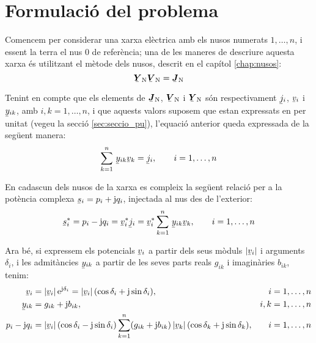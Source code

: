 \section{Formulació del problema}\label{sec:formul_prob} 

Comencem per considerar una xarxa elèctrica amb els nusos numerats
$1,\ldots,n$, i essent la terra el nus 0 de referència; una de les
maneres de descriure aquesta xarxa és utilitzant el mètode dels
nusos, descrit en el capítol \ref{chap:nusos}:
\begin{equation}
    \mcmplx{Y}\ped{N} \mcmplx{V}\ped{N} = \mcmplx{J}\ped{N}
\end{equation}

Tenint en compte que els elements de $\mcmplx{J}\ped{N}$,
$\mcmplx{V}\ped{N}$ i $\mcmplx{Y}\ped{N}$ són respectivament $\cmplx{j}_i$,
$\cmplx{v}_i$ i  $\cmplx{y}_{ik}$, amb $i,k=1,\ldots,n$, 
i que aquests valors suposem que estan expressats en per unitat (vegeu la
secció \ref{sec:seccio_pu}), l'equació anterior queda expressada de
la següent manera:
\begin{equation}
    \sum^n_{k=1}\, \cmplx{y}_{ik} \cmplx{v}_k = \cmplx{j}_i, \qquad i=1,\ldots,n
\end{equation}

En cadascun dels nusos de la xarxa es compleix la següent relació
per a la potència complexa $\cmplx{s}_i = p_i + \ju q_i$, injectada
al nus des de l'exterior:
\begin{equation}
    \cmplx{s}_i^* = p_i - \ju q_i = \cmplx{v}_i^* \cmplx{j}_i = \cmplx{v}_i^*
    \sum^n_{k=1}\, \cmplx{y}_{ik} \cmplx{v}_k, \qquad i=1,\ldots,n \label{eq:sconj}
\end{equation}

Ara bé, si expressem els potencials $\cmplx{v}_i$ a partir dels seus mòduls $|\cmplx{v}_i|$
i arguments $\delta_i$, i les admitàncies $\cmplx{y}_{ik}$ a partir de les seves parts
reals $g_{ik}$ i imaginàries $b_{ik}$, tenim:
\begin{align}
    \cmplx{v}_i &=|\cmplx{v}_i|\, \eu^{\ju\delta_i} = |\cmplx{v}_i|\,
    (\cos\delta_i+\ju\sin\delta_i), & i & =1,\ldots,n\\
    \cmplx{y}_{ik} &= g_{ik} + \ju b_{ik}, & i,k & =1,\ldots,n \\
    p_i - \ju q_i &= |\cmplx{v}_i|\, (\cos\delta_i - \ju\sin\delta_i) \sum^n_{k=1} (g_{ik} + \ju
    b_{ik}) \,|\cmplx{v}_k| \,(\cos\delta_k + \ju\sin\delta_k), & i & =1,\ldots,n
\end{align}

